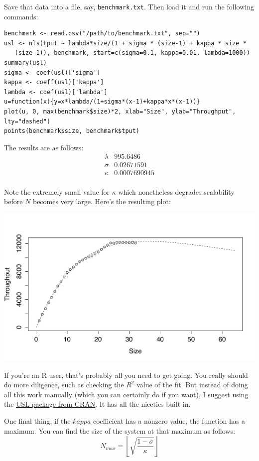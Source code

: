 \documentclass{vivid_layout}
\begin{document}
Save that data into a file, say, \texttt{benchmark.txt}. Then load it and run the following commands:

\begin{verbatim}
benchmark <- read.csv("/path/to/benchmark.txt", sep="")
usl <- nls(tput ~ lambda*size/(1 + sigma * (size-1) + kappa * size *
   (size-1)), benchmark, start=c(sigma=0.1, kappa=0.01, lambda=1000))
summary(usl)
sigma <- coef(usl)['sigma']
kappa <- coeff(usl)['kappa']
lambda <- coef(usl)['lambda']
u=function(x){y=x*lambda/(1+sigma*(x-1)+kappa*x*(x-1))}
plot(u, 0, max(benchmark$size)*2, xlab="Size", ylab="Throughput", lty="dashed")
points(benchmark$size, benchmark$tput)
\end{verbatim}

The results are as follows:
\[
\begin{array}{ll}
			\lambda&995.6486 \\
     \sigma & 0.02671591 \\
			       \kappa & 0.0007690945 \\
\end{array}
\]

Note the extremely small value for $\kappa$ which nonetheless degrades
scalability before $N$ becomes very large. Here's the resulting plot:
\begin{center}
\includegraphics[width=.85\linewidth]{scalability/cisco}
\end{center}

If you're an R user, that's probably all you need to get going. You really
should do more diligence, such as checking the $R^2$ value of the fit. But
instead of doing all this work manually (which you can certainly do if you
want), I suggest using the
\href{https://cran.r-project.org/web/packages/usl/}{USL package from CRAN}. It
has all the niceties built in.

One final thing: if the $kappa$ coefficient has a nonzero value, the function
has a maximum. You can find the size of the system at that maximum as follows:
\[
N_{max} = \left \lfloor \sqrt{\frac{1-\sigma}{\kappa}} \right \rfloor
\]
\end{document}
